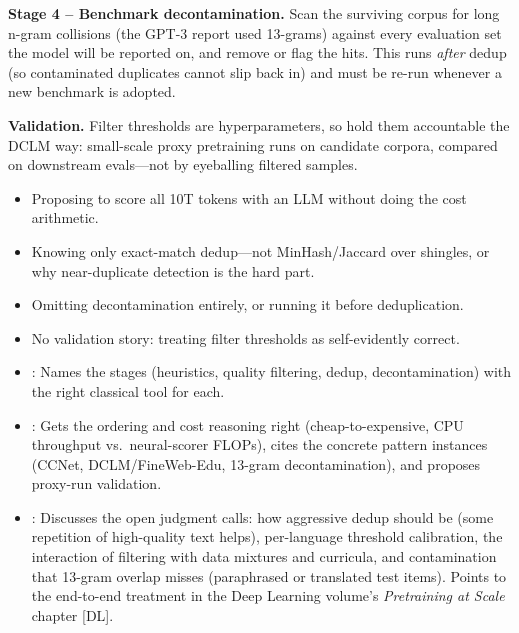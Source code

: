 \begin{interviewq}
\textbf{Stage 4 -- Benchmark decontamination.} Scan the surviving corpus for long
n-gram collisions (the GPT-3 report used 13-grams) against every evaluation set the
model will be reported on, and remove or flag the hits. This runs \emph{after} dedup
(so contaminated duplicates cannot slip back in) and must be re-run whenever a new
benchmark is adopted.

\textbf{Validation.} Filter thresholds are hyperparameters, so hold them accountable
the DCLM way: small-scale proxy pretraining runs on candidate corpora, compared on
downstream evals---not by eyeballing filtered samples.

\redflags
\begin{itemize}
    \item Proposing to score all 10T tokens with an LLM without doing the cost
          arithmetic.
    \item Knowing only exact-match dedup---not MinHash/Jaccard over shingles, or why
          near-duplicate detection is the hard part.
    \item Omitting decontamination entirely, or running it before deduplication.
    \item No validation story: treating filter thresholds as self-evidently correct.
\end{itemize}


\goodgreat
\begin{itemize}
    \item {}: Names the stages (heuristics, quality filtering, dedup,
          decontamination) with the right classical tool for each.
    \item {}: Gets the ordering and cost reasoning right
          (cheap-to-expensive, CPU throughput vs.\ neural-scorer FLOPs), cites the
          concrete pattern instances (CCNet, DCLM/FineWeb-Edu, 13-gram
          decontamination), and proposes proxy-run validation.
    \item {}: Discusses the open judgment calls: how aggressive dedup
          should be (some repetition of high-quality text helps), per-language
          threshold calibration, the interaction of filtering with data mixtures and
          curricula, and contamination that 13-gram overlap misses (paraphrased or
          translated test items). Points to the end-to-end treatment in the Deep
          Learning volume's \emph{Pretraining at Scale} chapter [DL].
\end{itemize}

\end{interviewq}

